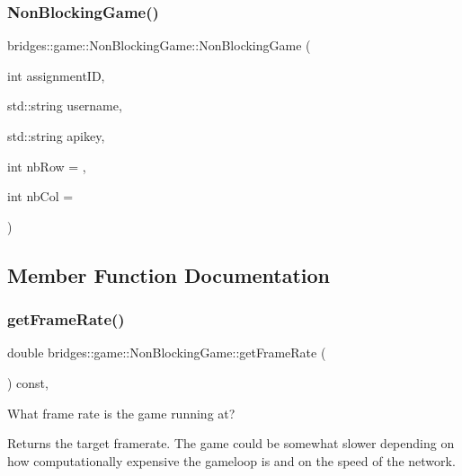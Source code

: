 \subsubsection{\texorpdfstring{Non\+Blocking\+Game()}{NonBlockingGame()}}
{\footnotesize\ttfamily bridges\+::game\+::\+Non\+Blocking\+Game\+::\+Non\+Blocking\+Game (\begin{DoxyParamCaption}\item[{int}]{assignment\+ID,  }\item[{std\+::string}]{username,  }\item[{std\+::string}]{apikey,  }\item[{int}]{nb\+Row = {},  }\item[{int}]{nb\+Col = {} }\end{DoxyParamCaption})\hspace{0.3cm}{\ttfamily [inline]}}



\subsection{Member Function Documentation}
\mbox{\label{classbridges_1_1game_1_1_non_blocking_game_ab3bee2db9d0d2c4e74ae7943516fb53a}} 
\subsubsection{\texorpdfstring{get\+Frame\+Rate()}{getFrameRate()}}
{\footnotesize\ttfamily double bridges\+::game\+::\+Non\+Blocking\+Game\+::get\+Frame\+Rate (\begin{DoxyParamCaption}{ }\end{DoxyParamCaption}) const\hspace{0.3cm}{\ttfamily [inline]}, {\ttfamily [protected]}}



What frame rate is the game running at? 

\begin{DoxyReturn}{Returns}
the target framerate. The game could be somewhat slower depending on how computationally expensive the gameloop is and on the speed of the network. 
\end{DoxyReturn}
\mbox{\label{classbridges_1_1game_1_1_non_blocking_game_af88089437e34df580b247cb27047fd14}} 
